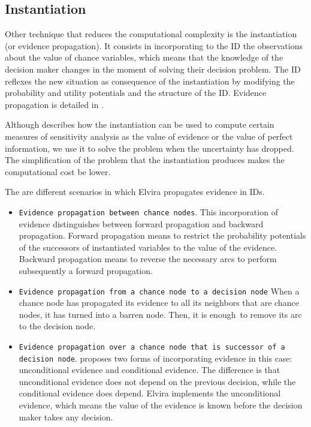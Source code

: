 \subsection{Instantiation}

Other technique that reduces the computational complexity is the
instantiation (or evidence propagation). It consists in incorporating to the
ID the observations about the value of chance variables, which means that
the knowledge of the decision maker changes in the moment of solving their
decision problem. The ID reflexes the new situation as consequence of the
instantiation by modifying the probability and utility potentials and the
structure of the ID. Evidence propagation is detailed in \cite{ezawa98}.

Although \cite{ezawa98} describes how the instantiation can be used to
compute certain measures of sensitivity analysis as the value of evidence or
the value of perfect information, we use it to solve the problem when the
uncertainty has dropped. The simplification of the problem that the
instantiation produces makes the computational cost be lower.

The are different scenarios in which Elvira propagates evidence in IDs.

\begin{itemize}
\item \texttt{Evidence propagation between chance nodes}. This incorporation
of evidence distinguishes between forward propagation and backward
propagation. Forward propagation means to restrict the probability
potentials of the successors of instantiated variables to the value of the
evidence. Backward propagation means to reverse the necessary arcs to
perform subsequently a forward propagation.

\item \texttt{Evidence propagation from a chance node to a decision node}
When a chance node has propagated its evidence to all its neighbors that are
chance nodes, it has turned into a barren node. Then, it is enough\ to
remove its arc to the decision node.

\item \texttt{Evidence propagation over a chance node that is successor of a
decision node}. \cite{ezawa98} proposes two forms of incorporating evidence
in this case: unconditional evidence and conditional evidence. The
difference is that unconditional evidence does not depend on the previous
decision, while the conditional evidence does depend. Elvira implements the
unconditional evidence, which means the value of the evidence is known
before the decision maker takes any decision.
\end{itemize}

